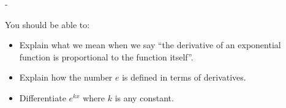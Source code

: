 \documentclass{article}
\makeatletter
\newlength{\tipmargin}
\renewenvironment{framed}{
  \setlength{\tipmargin}{\textwidth-\linewidth}
  \advance\@totalleftmargin-\tipmargin
  \def\FrameCommand{\hspace{\tipmargin}\fbox}%
  \advance\linewidth\tipmargin
  \MakeFramed {\advance\hsize-\width \FrameRestore}%
}
{\endMakeFramed}
\makeatother
\begin{document}

\begin{problemonly}
  \begin{framed}

You should be able to:
    \begin{itemize}[topsep=0pt,partopsep=0pt,parsep=8pt,itemsep=0pt]
    \item Explain what we mean when we say ``the derivative of an exponential function is proportional to the function itself''.

    \item Explain how the number $e$ is defined in terms of derivatives.

    \item Differentiate $e^{kx}$ where $k$ is any constant.

    \end{itemize}
  \end{framed}
\end{problemonly}
\end{document}

